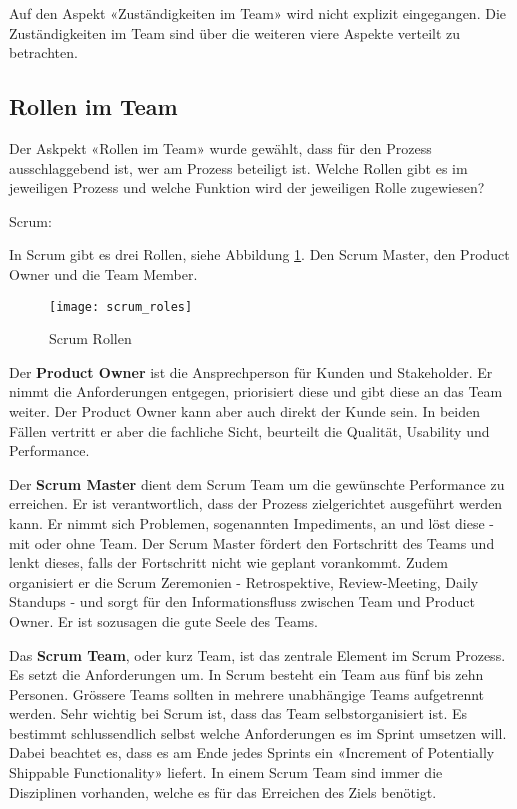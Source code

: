 Auf den Aspekt «Zuständigkeiten im Team» wird nicht explizit eingegangen. Die Zuständigkeiten im Team sind über die weiteren viere Aspekte verteilt zu betrachten.

\subsection{Rollen im Team}\label{rollen}

Der Askpekt «Rollen im Team» wurde gewählt, dass für den Prozess ausschlaggebend ist, wer am Prozess beteiligt ist. Welche Rollen gibt es im jeweiligen Prozess und welche Funktion wird der jeweiligen Rolle zugewiesen?

{\Large Scrum:} \cite{scrumRoles} \medskip

In Scrum gibt es drei Rollen, siehe Abbildung \ref{fig:scrumrollen}. Den Scrum Master, den Product Owner und die Team Member. 
\begin{figure}[H]
	\centering
	\texttt{[image: scrum\_roles]}
	\caption{Scrum Rollen \cite{scrumRoles}}
	\label{fig:scrumrollen}
\end{figure}

Der \textbf{Product Owner} ist die Ansprechperson für Kunden und Stakeholder. Er nimmt die Anforderungen entgegen, priorisiert diese und gibt diese an das Team weiter. Der Product Owner kann aber auch direkt der Kunde sein. In beiden Fällen vertritt er aber die fachliche Sicht, beurteilt die Qualität, Usability und Performance. \medskip

Der \textbf{Scrum Master} dient dem Scrum Team um die gewünschte Performance zu erreichen. Er ist verantwortlich, dass der Prozess zielgerichtet ausgeführt werden kann. Er nimmt sich Problemen, sogenannten Impediments, an und löst diese - mit oder ohne Team. Der Scrum Master fördert den Fortschritt des Teams und lenkt dieses, falls der Fortschritt nicht wie geplant vorankommt. Zudem organisiert er die Scrum Zeremonien - Retrospektive, Review-Meeting, Daily Standups - und sorgt für den Informationsfluss zwischen Team und Product Owner. Er ist sozusagen die gute Seele des Teams. \medskip

Das \textbf{Scrum Team}, oder kurz Team, ist das zentrale Element im Scrum Prozess. Es setzt die Anforderungen um. In Scrum besteht ein Team aus fünf bis zehn Personen. Grössere Teams sollten in mehrere unabhängige Teams aufgetrennt werden. Sehr wichtig bei Scrum ist, dass das Team selbstorganisiert ist. Es bestimmt schlussendlich selbst welche Anforderungen es im Sprint umsetzen will. Dabei beachtet es, dass es am Ende jedes Sprints ein «Increment of  Potentially Shippable Functionality» liefert. In einem Scrum Team sind immer die Disziplinen vorhanden, welche es für das Erreichen des Ziels benötigt.
\bigskip

